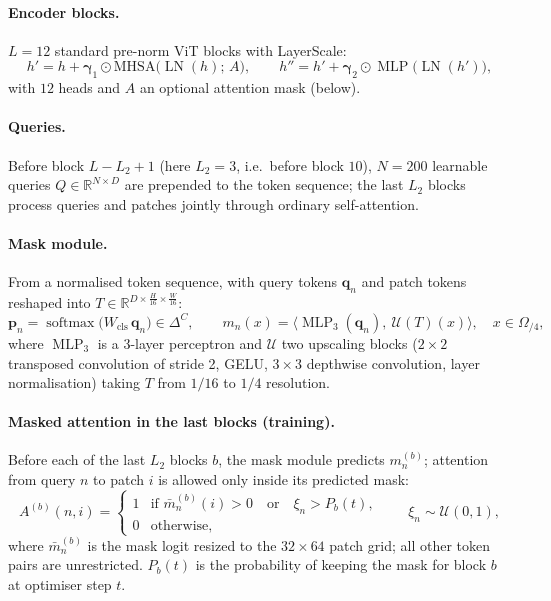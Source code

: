 \documentclass[11pt,a4paper]{article}
\newcommand{\R}{\mathbb{R}}
\newcommand{\1}{\mathbb{1}}
\DeclareMathOperator{\softmax}{softmax}
\DeclareMathOperator{\LN}{LN}
\DeclareMathOperator{\MLP}{MLP}
\begin{document}
\paragraph{Encoder blocks.} $L=12$ standard pre-norm ViT blocks with
LayerScale:
\[
h' = h + \bm\gamma_1\odot\mathrm{MHSA}\big(\LN(h);\,A\big),\qquad
h'' = h' + \bm\gamma_2\odot\MLP\big(\LN(h')\big),
\]
with $12$ heads and $A$ an optional attention mask (below).

\paragraph{Queries.} Before block $L-L_2+1$ (here $L_2 = 3$, i.e.\ before
block $10$), $N=200$ learnable queries $Q\in\R^{N\times D}$ are prepended to
the token sequence; the last $L_2$ blocks process queries and patches jointly
through ordinary self-attention.

\paragraph{Mask module.} From a normalised token sequence, with query tokens
$\bm q_n$ and patch tokens reshaped into $T\in\R^{D\times\frac H{16}\times\frac W{16}}$:
\[
\bm p_n = \softmax\big(W_{\text{cls}}\,\bm q_n\big)\in\Delta^{C},
\qquad
m_n(x) = \big\langle \MLP_3(\bm q_n),\ \mathcal{U}(T)(x)\big\rangle,
\quad x\in\Omega_{/4},
\]
where $\MLP_3$ is a 3-layer perceptron and $\mathcal{U}$ two upscaling blocks
($2\times2$ transposed convolution of stride 2, GELU, $3\times3$ depthwise
convolution, layer normalisation) taking $T$ from $1/16$ to $1/4$ resolution.

\paragraph{Masked attention in the last blocks (training).} Before each of the
last $L_2$ blocks $b$, the mask module predicts $m^{(b)}_n$; attention from
query $n$ to patch $i$ is allowed only inside its predicted mask:
\[
A^{(b)}(n,i) =
\begin{cases}
1 & \text{if } \bar m^{(b)}_n(i) > 0 \quad\text{or}\quad \xi_n > P_b(t),\\
0 & \text{otherwise},
\end{cases}
\qquad \xi_n\sim\mathcal{U}(0,1),
\]
where $\bar m^{(b)}_n$ is the mask logit resized to the $32\times64$ patch
grid; all other token pairs are unrestricted. $P_b(t)$ is the probability of
keeping the mask for block $b$ at optimiser step $t$.
\end{document}
